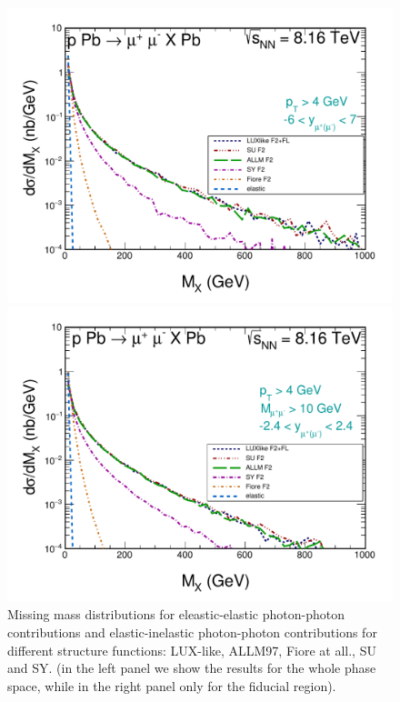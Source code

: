 
\begin{figure}[!htbp]
\begin{minipage}{0.47\textwidth}
 \centerline{\includegraphics[width=1.0\textwidth]{figures_Marta/MX.pdf}}
\end{minipage}
\begin{minipage}{0.47\textwidth}
 \centerline{\includegraphics[width=1.0\textwidth]{figures_Marta/MX-c.pdf}}
\end{minipage}
\caption{
Missing mass distributions for eleastic-elastic photon-photon contributions and elastic-inelastic photon-photon contributions for different structure functions: LUX-like, ALLM97, Fiore at all., SU and SY. (in the left panel we show the results for the whole phase space, while in the right panel only for the fiducial region).
}
\label{fig:dsig_dy}
\end{figure}





